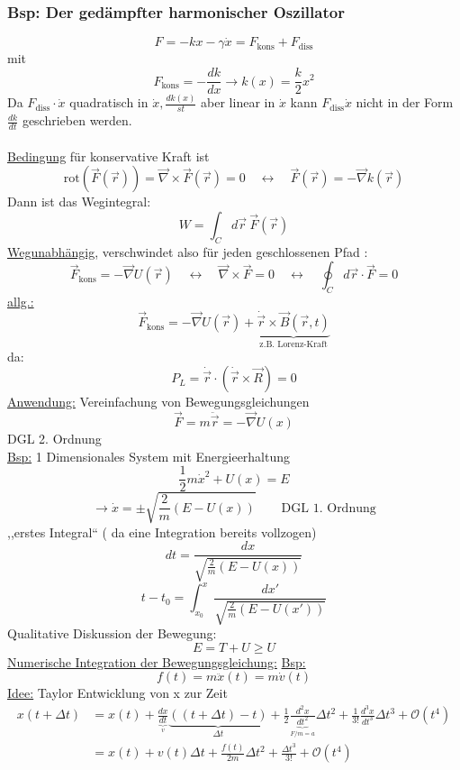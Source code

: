 \documentclass[titlepage,12pt,a4paper,ngerman]{report}
\newcommand{\tx}[1]{\textrm{#1}}
\newcommand{\ub}[1]{\underbrace{#1}}
\begin{document}
{\subsubsection{Bsp: Der gedämpfter harmonischer Oszillator}
$$ F = -kx - \gamma \dot{x} = F_{\tx{kons}} + F_{\tx{diss}}$$
mit
$$F_{\tx{kons}} = -\frac{dk}{dx} \rightarrow k(x) = \frac{k}{2} x^2$$
Da $F_{\tx{diss}} \cdot \dot{x}$ quadratisch in $\dot{x} , \frac{dk(x)}{st}$ aber linear in $\dot{x}$ kann $F_{\tx{diss}} \dot{x}$ nicht in der Form $\frac{dk}{dt}$ geschrieben werden.\\\\
\underline{Bedingung} für konservative Kraft ist
$$ \tx{rot}(\vec{F}(\vec{r})) = \vec{\nabla} \times \vec{F}(\vec{r}) = 0 \quad \leftrightarrow \quad \vec{F}(\vec{r}) = -\vec{\nabla} k(\vec{r})$$
Dann ist das Wegintegral:
$$ W = \int_C d\vec{r}\  \vec{F} (\vec{r})$$
\underline{Wegunabhängig}, verschwindet also für jeden geschlossenen Pfad :
$$ \vec{F}_{\tx{kons}} = -\vec{\nabla} U(\vec{r}) \quad \leftrightarrow  \quad \vec{\nabla} \times \vec{F} = 0 \quad \leftrightarrow \quad  \oint_C d\vec{r} \cdot \vec{F}= 0$$
\underline{allg.:} 
$$ \vec{F}_{\tx{kons}} = - \vec{\nabla} U(\vec{r}) + \ub{ \dot{\vec{r}} \times \vec{B} (\vec{r} , t) } _{\tx{z.B. Lorenz-Kraft}}$$
da:
$$P_L = \dot{\vec{r}} \cdot (\dot{\vec{r}} \times \vec{R} ) = 0$$
\underline{Anwendung:} Vereinfachung von Bewegungsgleichungen
$$\vec{F} = m \ddot{\vec{r}} = - \vec{\nabla} U (x)$$
DGL 2. Ordnung\\
\underline{Bsp:} 1 Dimensionales System mit Energieerhaltung
$$ \frac{1}{2} m \dot{x}^2 + U(x) = E$$
$$\rightarrow \dot{x} = \pm \sqrt{\frac{2}{m}(E -U(x))} \qquad \textrm{DGL 1. Ordnung}$$
,,erstes Integral`` ( da eine Integration bereits vollzogen)
$$ dt = \frac{dx}{\sqrt{\frac{2}{m} (E-U(x))}}$$
$$ t-t_0 = \int_{x_0}^x \frac{dx'}{\sqrt{\frac{2}{m} (E-U(x'))}}$$
Qualitative Diskussion der Bewegung:\\
$$E=T+U\ge U$$
\underline{Numerische Integration der Bewegungsgleichung:}
\underline{Bsp:} $$f(t) = m \ddot{x}(t) = m \dot{v}(t)$$
\underline{Idee:} Taylor Entwicklung von x zur Zeit 
\begin{align*}
x(t+\Delta t) &= x(t) + \frac{dx}{\underbrace{dt}_{v}} \underbrace{((t+\Delta t) -t)}_{\Delta t} + \frac{1}{2} \frac{d^2x}{\underbrace{dt^2}_{F/m = a}} \Delta t^2 + \frac{1}{3!} \frac{d^3x}{dt^3} \Delta t^3 + \mathcal{O}(t^4)\\
&= x(t) + v(t) \Delta t + \frac{f(t)}{2m} \Delta t^2 + \frac{\Delta t^3}{3!} + \mathcal{O}(t^4)
\end{align*}
}
\end{document}
